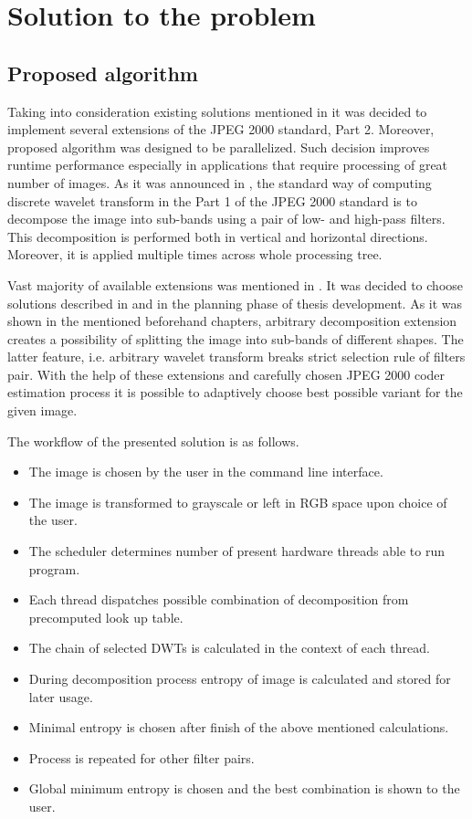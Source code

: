 \section{Solution to the problem}

\subsection{Proposed algorithm}

Taking into consideration existing solutions mentioned in  it was decided to
implement several extensions of the JPEG 2000 standard, Part 2. Moreover, proposed algorithm
was designed to be parallelized. Such decision improves runtime performance especially in applications
that require processing of great number of images. As it was announced in , the standard
way of computing discrete wavelet transform in the Part 1 of the JPEG 2000 standard is to decompose the
image into sub-bands using a pair of low- and high-pass filters. This decomposition is performed both in
vertical and horizontal directions. Moreover, it is applied multiple times across whole processing tree.

Vast majority of available extensions was mentioned in . It was decided to choose
solutions described in  and  in the
planning phase of thesis development. As it was shown in the mentioned beforehand chapters, arbitrary decomposition
extension creates a possibility of splitting the image into sub-bands of different shapes. The latter feature,
i.e. arbitrary wavelet transform breaks strict selection rule of filters pair. With the help of these
extensions and carefully chosen JPEG 2000 coder estimation process it is possible to adaptively choose
best possible variant for the given image.

The workflow of the presented solution is as follows.

\begin{itemize}
    \item The image is chosen by the user in the command line interface.
    \item The image is transformed to grayscale or left in RGB space upon choice of the user.
    \item The scheduler determines number of present hardware threads able to run program.
    \item Each thread dispatches possible combination of decomposition from precomputed look up table.
    \item The chain of selected DWTs is calculated in the context of each thread.
    \item During decomposition process entropy of image is calculated and stored for later usage.
    \item Minimal entropy is chosen after finish of the above mentioned calculations.
    \item Process is repeated for other filter pairs.
    \item Global minimum entropy is chosen and the best combination is shown to the user.
\end{itemize}

